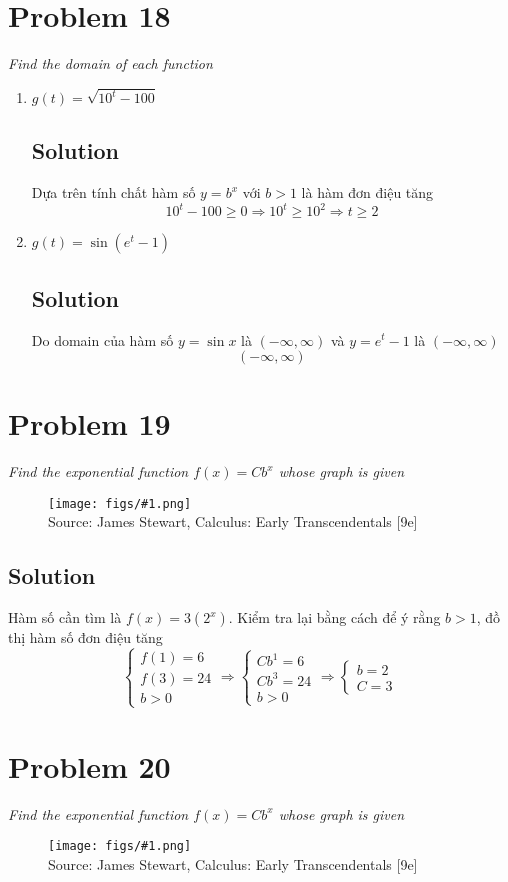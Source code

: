 \documentclass[11pt]{article}
\newcommand{\soln}{\subsection*}
\newcommand{\qn}{\textit}
\newcommand{\imagesource}[1]{{\footnotesize Source: #1}}
\newcommand{\imgqn}[1]{
	\begin{figure}[H]
		\centering
		\texttt{[image: figs/\#1.png]}\\
		\imagesource{James Stewart, Calculus: Early Transcendentals [9e]}
	\end{figure}
}
\begin{document}
\section*{Problem 18}

\qn{Find the domain of each function}

\begin{enumerate}
	\item \qn{$g(t)=\sqrt{10^t-100}$}
	\soln{Solution}
	Dựa trên tính chất hàm số $y=b^x$ với $b>1$ là hàm đơn điệu tăng
	$$10^t-100 \ge 0 \Rightarrow 10^t \ge 10^2 \Rightarrow t \ge 2$$
	
	\item \qn{$g(t)=\sin(e^t-1)$}
	\soln{Solution}
	Do domain của hàm số $y=\sin{x}$ là $(-\infty, \infty)$ và $y=e^t-1$ là $(-\infty, \infty)$
	$$(-\infty, \infty)$$
\end{enumerate}

\section*{Problem 19}

\qn{Find the exponential function $f(x)=Cb^x$ whose graph is given}
\imgqn{1.4.19}

\soln{Solution}
Hàm số cần tìm là $f(x)=3(2^x)$. Kiểm tra lại bằng cách để ý rằng $b>1$, đồ thị hàm số đơn điệu tăng 
\begin{equation*}
	\begin{cases}
		f(1)=6 \\
		f(3)=24 \\
		b>0
	\end{cases}
	\Rightarrow
	\begin{cases}
		Cb^1=6 \\
		Cb^3=24 \\
		b>0
	\end{cases}
	\Rightarrow
	\begin{cases}
		b=2 \\
		C=3
	\end{cases}
\end{equation*}

\section*{Problem 20}

\qn{Find the exponential function $f(x)=Cb^x$ whose graph is given}
\imgqn{1.4.20}
\end{document}
